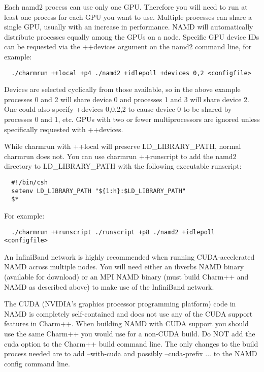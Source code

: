 Each namd2 process can use only one GPU.  Therefore you will need to run
at least one process for each GPU you want to use.  Multiple processes
can share a single GPU, usually with an increase in performance.  NAMD
will automatically distribute processes equally among the GPUs on a node.
Specific GPU device IDs can be requested via the ++devices argument on
the namd2 command line, for example:

\begin{verbatim}
  ./charmrun ++local +p4 ./namd2 +idlepoll +devices 0,2 <configfile>
\end{verbatim}

Devices are selected cyclically from those available, so in the above
example processes 0 and 2 will share device 0 and processes 1 and 3 will
share device 2.  One could also specify +devices 0,0,2,2 to cause device
0 to be shared by processes 0 and 1, etc.  GPUs with two or fewer
multiprocessors are ignored unless specifically requested with ++devices.

While charmrun with ++local will preserve LD\_LIBRARY\_PATH, normal
charmrun does not.  You can use charmrun ++runscript to add the namd2
directory to LD\_LIBRARY\_PATH with the following executable runscript:

\begin{verbatim}
  #!/bin/csh
  setenv LD_LIBRARY_PATH "${1:h}:$LD_LIBRARY_PATH"
  $*
\end{verbatim}

For example:

\begin{verbatim}
  ./charmrun ++runscript ./runscript +p8 ./namd2 +idlepoll <configfile>
\end{verbatim}

An InfiniBand network is highly recommended when running CUDA-accelerated
NAMD across multiple nodes.  You will need either an ibverbs NAMD binary
(available for download) or an MPI NAMD binary (must build Charm++ and
NAMD as described above) to make use of the InfiniBand network.

The CUDA (NVIDIA's graphics processor programming platform) code in
NAMD is completely self-contained and does not use any of the CUDA
support features in Charm++.  When building NAMD with CUDA support
you should use the same Charm++ you would use for a non-CUDA build.
Do NOT add the cuda option to the Charm++ build command line.  The
only changes to the build process needed are to add --with-cuda and
possibly --cuda-prefix ... to the NAMD config command line.

